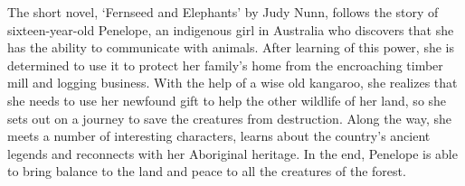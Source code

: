 

The short novel, ‘Fernseed and Elephants’ by Judy Nunn, follows the story of sixteen-year-old Penelope, an indigenous girl in Australia who discovers that she has the ability to communicate with animals. After learning of this power, she is determined to use it to protect her family's home from the encroaching timber mill and logging business. With the help of a wise old kangaroo, she realizes that she needs to use her newfound gift to help the other wildlife of her land, so she sets out on a journey to save the creatures from destruction. Along the way, she meets a number of interesting characters, learns about the country’s ancient legends and reconnects with her Aboriginal heritage. In the end, Penelope is able to bring balance to the land and peace to all the creatures of the forest.